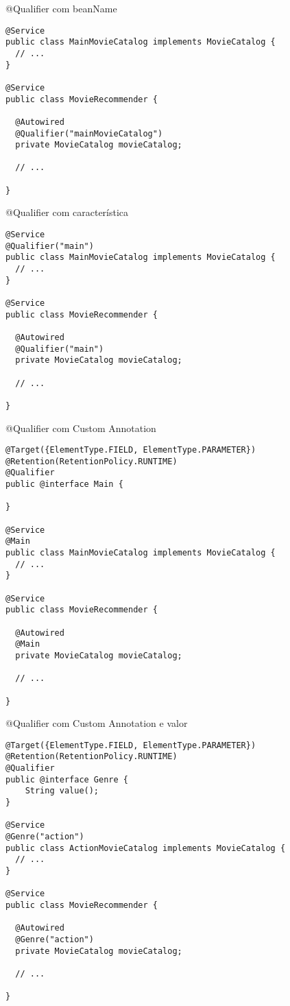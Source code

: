 \documentclass{beamer}
\begin{document}
\begin{frame}[fragile]{@Qualifier com beanName}
 \begin{verbatim}
@Service
public class MainMovieCatalog implements MovieCatalog {
  // ...
}

@Service
public class MovieRecommender {

  @Autowired
  @Qualifier("mainMovieCatalog")
  private MovieCatalog movieCatalog;

  // ...

}
  \end{verbatim}
\end{frame}

\begin{frame}[fragile]{@Qualifier com característica}
 \begin{verbatim}
@Service
@Qualifier("main")
public class MainMovieCatalog implements MovieCatalog {
  // ...
}

@Service
public class MovieRecommender {

  @Autowired
  @Qualifier("main")
  private MovieCatalog movieCatalog;

  // ...

}
  \end{verbatim}
\end{frame}

\begin{frame}[fragile]{@Qualifier com Custom Annotation}
 \begin{verbatim}
@Target({ElementType.FIELD, ElementType.PARAMETER})
@Retention(RetentionPolicy.RUNTIME)
@Qualifier
public @interface Main {
    
}

@Service
@Main
public class MainMovieCatalog implements MovieCatalog {
  // ...
}

@Service
public class MovieRecommender {

  @Autowired
  @Main
  private MovieCatalog movieCatalog;

  // ...

}
  \end{verbatim}
\end{frame}

\begin{frame}[fragile]{@Qualifier com Custom Annotation e valor}
 \begin{verbatim}
@Target({ElementType.FIELD, ElementType.PARAMETER})
@Retention(RetentionPolicy.RUNTIME)
@Qualifier
public @interface Genre {
    String value();
}

@Service
@Genre("action")
public class ActionMovieCatalog implements MovieCatalog {
  // ...
}

@Service
public class MovieRecommender {

  @Autowired
  @Genre("action")
  private MovieCatalog movieCatalog;

  // ...
  
}
  \end{verbatim}
\end{frame}
\end{document}
